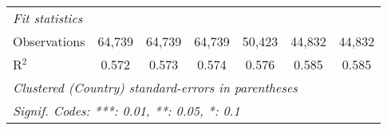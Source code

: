 \begin{tabular}{lcccccc}
   \midrule \emph{Fit statistics}\\
   Observations                                                                                        & 64,739  & 64,739         & 64,739         & 50,423         & 44,832         & 44,832\\  
   R$^2$                                                                                               & 0.572   & 0.573          & 0.574          & 0.576          & 0.585          & 0.585\\  
   \midrule
   \multicolumn{7}{l}{\emph{Clustered (Country) standard-errors in parentheses}}\\
   \multicolumn{7}{l}{\emph{Signif. Codes: ***: 0.01, **: 0.05, *: 0.1}}\\
\end{tabular}
\par\endgroup


